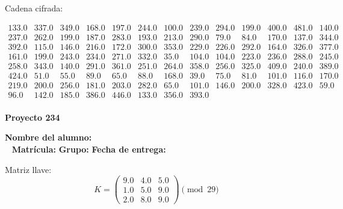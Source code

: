 \documentclass[12pt]{article}
\begin{document}
Cadena cifrada:
\begin{center}
$\begin{array}{lllllllllllll}
133.0 & 337.0 & 349.0 & 168.0 & 197.0 & 244.0 & 100.0 & 239.0 & 294.0 & 199.0 & 400.0 & 481.0 & 140.0\\
237.0 & 262.0 & 199.0 & 187.0 & 283.0 & 193.0 & 213.0 & 290.0 & 79.0 & 84.0 & 170.0 & 137.0 & 344.0\\
392.0 & 115.0 & 146.0 & 216.0 & 172.0 & 300.0 & 353.0 & 229.0 & 226.0 & 292.0 & 164.0 & 326.0 & 377.0\\
161.0 & 199.0 & 243.0 & 234.0 & 271.0 & 332.0 & 35.0 & 104.0 & 104.0 & 223.0 & 236.0 & 288.0 & 245.0\\
258.0 & 343.0 & 140.0 & 291.0 & 361.0 & 251.0 & 264.0 & 358.0 & 256.0 & 325.0 & 409.0 & 240.0 & 389.0\\
424.0 & 51.0 & 55.0 & 89.0 & 65.0 & 88.0 & 168.0 & 39.0 & 75.0 & 81.0 & 101.0 & 116.0 & 170.0\\
219.0 & 200.0 & 256.0 & 181.0 & 203.0 & 282.0 & 65.0 & 101.0 & 146.0 & 200.0 & 328.0 & 423.0 & 59.0\\
96.0 & 142.0 & 185.0 & 386.0 & 446.0 & 133.0 & 356.0 & 393.0\\
\end{array}$
\end{center}

\newpage


\textbf{Proyecto 234}

\textbf{Nombre del alumno:} \underline{\hspace{13cm}}\\\
\vspace{1cm}
\textbf{Matrícula:} \underline{\hspace{4cm}} \hspace{1cm}
\textbf{Grupo:} \underline{\hspace{2cm}}
\textbf{Fecha de entrega:} \underline{\hspace{2cm}}

\medskip

Matriz llave:
\[
K = \begin{pmatrix}
9.0 & 4.0 & 5.0\\
1.0 & 5.0 & 9.0\\
2.0 & 8.0 & 9.0
\end{pmatrix} \pmod{29}
\]
\end{document}

